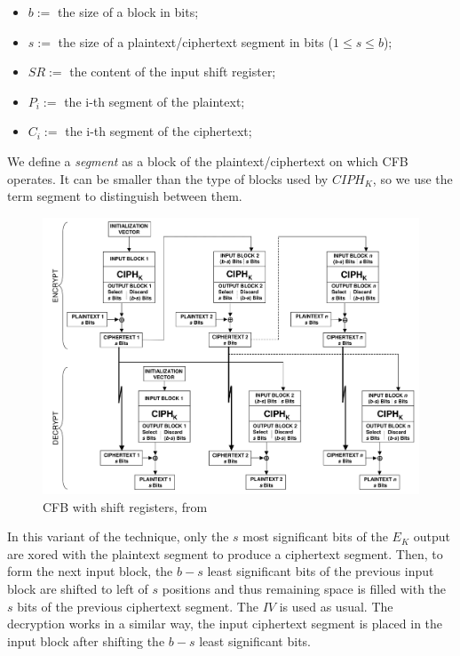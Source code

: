 \documentclass[11pt]{article}
\newcommand\CIPH{C\!I\!P\!H_K}
\begin{document}
\begin{itemize}
\item $b := $ the size of a block in bits;
\item $s := $ the size of a plaintext/ciphertext segment in bits ($1 \le s \le b$);
\item $SR := $ the content of the input shift register;
\item $P_i := $ the i-th segment of the plaintext;
\item $C_i := $ the i-th segment of the ciphertext;
\end{itemize}

We define a {\em segment} as a block of the plaintext/ciphertext on which CFB operates. It can be smaller than the type of blocks used by $\CIPH$, so we use the term segment to distinguish between them.

\begin{figure}[!ht]
  \centering
  \includegraphics[width=1\textwidth]{pic3-hw1-1692419}
  \caption{CFB with shift registers, from \cite{nist}}
  \label{fig:cfb_shift}
\end{figure}

In this variant of the technique, only the $s$ most significant bits of the $E_K$ output are xored with the plaintext segment to produce a ciphertext segment. Then, to form the next input block, the $b - s$ least significant bits of the previous input block are shifted to left of $s$ positions and thus remaining space is filled with the $s$ bits of the previous ciphertext segment. The $IV$ is used as usual.
The decryption works in a similar way, the input ciphertext segment is placed in the input block after shifting the $b - s$ least significant bits.
\end{document}
